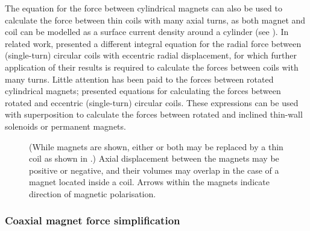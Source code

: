 \documentclass[11pt,a4paper]{memoir}
\begin{document}
The equation for the force between cylindrical magnets can also be used to calculate the force between thin coils with many axial turns, as both magnet and coil can be modelled as a surface current density around a cylinder (see ). In related work, \textcite{kim1996-ietm} presented a different integral equation for the radial force between (single-turn) circular coils with eccentric radial displacement, for which further application of their results is required to calculate the forces between coils with many turns.
Little attention has been paid to the forces between rotated cylindrical magnets; \textcite{babic2011-ietm-incl-coil} presented equations for calculating the forces between rotated and eccentric (single-turn) circular coils.
These expressions can be used with superposition to calculate the forces between rotated and inclined thin-wall solenoids or permanent magnets.

\begin{figure}
\centering
{}
{
  (While magnets are shown, either or both may be replaced by a thin coil as shown in .)
  Axial displacement between the magnets may be positive or negative, and their volumes may overlap in the case of a magnet located inside a coil.
  Arrows within the magnets indicate direction of magnetic polarisation.
}
\end{figure}

\subsubsection{Coaxial magnet force simplification}
\end{document}
